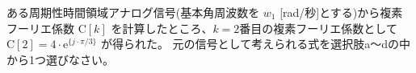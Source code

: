 ある周期性時間領域アナログ信号(基本角周波数を $w_1$ [rad/秒]とする)から複素フーリエ係数 $\textrm{C}[k]$ を計算したところ、$k=2$番目の複素フーリエ係数として $\textrm{C}[2] = 4 \cdot \textrm{e}^{\{j \cdot \pi/3 \}}$ が得られた。
元の信号として考えられる式を選択肢a〜dの中から1つ選びなさい。
